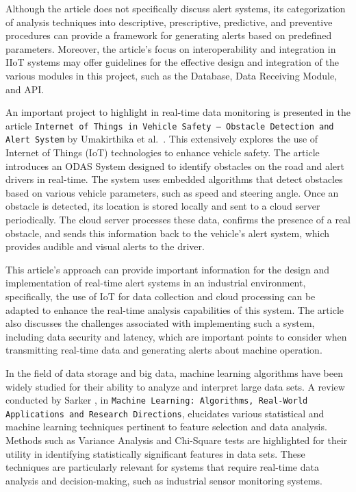 Although the article does not specifically discuss alert systems, its categorization of analysis techniques into descriptive, prescriptive, predictive, and preventive procedures can provide a framework for generating alerts based on predefined parameters. Moreover, the article's focus on interoperability and integration in IIoT systems may offer guidelines for the effective design and integration of the various modules in this project, such as the Database, Data Receiving Module, and \gls{API}.

An important project to highlight in real-time data monitoring is presented in the article \texttt{Internet of Things in Vehicle Safety – Obstacle Detection and Alert System} by Umakirthika et al.~\cite{Umakirthika2018}. This extensively explores the use of Internet of Things (IoT) technologies to enhance vehicle safety. The article introduces an \gls{ODAS} System designed to identify obstacles on the road and alert drivers in real-time. The system uses embedded algorithms that detect obstacles based on various vehicle parameters, such as speed and steering angle. Once an obstacle is detected, its location is stored locally and sent to a cloud server periodically. The cloud server processes these data, confirms the presence of a real obstacle, and sends this information back to the vehicle's alert system, which provides audible and visual alerts to the driver.

This article's approach can provide important information for the design and implementation of real-time alert systems in an industrial environment, specifically, the use of IoT for data collection and cloud processing can be adapted to enhance the real-time analysis capabilities of this system. The article also discusses the challenges associated with implementing such a system, including data security and latency, which are important points to consider when transmitting real-time data and generating alerts about machine operation.

In the field of data storage and big data, machine learning algorithms have been widely studied for their ability to analyze and interpret large data sets. A review conducted by Sarker \cite{sarker2021machine}, in \texttt{Machine Learning: Algorithms, Real-World Applications and Research Directions}, elucidates various statistical and machine learning techniques pertinent to feature selection and data analysis. Methods such as Variance Analysis and Chi-Square tests are highlighted for their utility in identifying statistically significant features in data sets. These techniques are particularly relevant for systems that require real-time data analysis and decision-making, such as industrial sensor monitoring systems.

